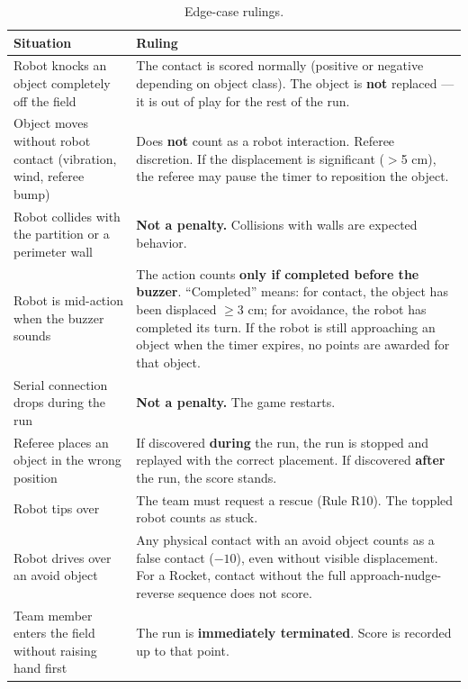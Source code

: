 \documentclass[a4]{article}
\begin{document}
\begin{table}[H]
\centering
\begin{tabular}{p{5cm}p{8cm}}
\toprule
\textbf{Situation} & \textbf{Ruling} \\
\midrule
Robot knocks an object completely off the field & The contact is scored normally (positive or negative depending on object class). The object is \textbf{not} replaced --- it is out of play for the rest of the run. \\
\addlinespace
Object moves without robot contact (vibration, wind, referee bump) & Does \textbf{not} count as a robot interaction. Referee discretion. If the displacement is significant ($>$5 cm), the referee may pause the timer to reposition the object. \\
\addlinespace
Robot collides with the partition or a perimeter wall & \textbf{Not a penalty.} Collisions with walls are expected behavior. \\
\addlinespace
Robot is mid-action when the buzzer sounds & The action counts \textbf{only if completed before the buzzer}. ``Completed'' means: for contact, the object has been displaced $\geq$3 cm; for avoidance, the robot has completed its turn. If the robot is still approaching an object when the timer expires, no points are awarded for that object. \\
\addlinespace
Serial connection drops during the run & \textbf{Not a penalty.} The game restarts. \\
\addlinespace
Referee places an object in the wrong position & If discovered \textbf{during} the run, the run is stopped and replayed with the correct placement. If discovered \textbf{after} the run, the score stands. \\
\addlinespace
Robot tips over & The team must request a rescue (Rule R10). The toppled robot counts as stuck. \\
\addlinespace
Robot drives over an avoid object & Any physical contact with an avoid object counts as a false contact ($-10$), even without visible displacement. For a Rocket, contact without the full approach-nudge-reverse sequence does not score. \\
\addlinespace
Team member enters the field without raising hand first & The run is \textbf{immediately terminated}. Score is recorded up to that point. \\
\bottomrule
\end{tabular}
\caption{Edge-case rulings.}
\end{table}
\end{document}
